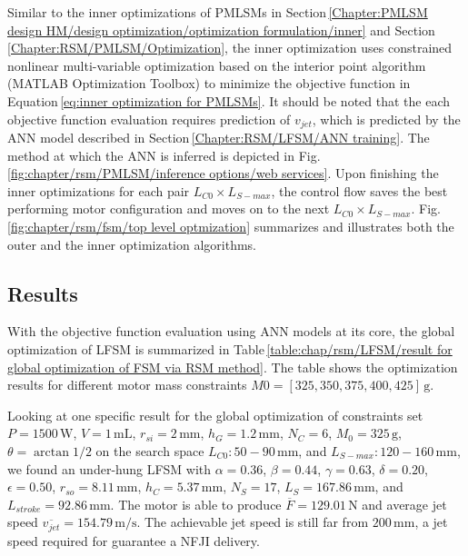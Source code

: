                 
                Similar to the inner optimizations of \acsp{PMLSM} in Section\,\ref{Chapter:PMLSM design HM/design optimization/optimization formulation/inner} and Section\,\ref{Chapter:RSM/PMLSM/Optimization}, the inner optimization uses constrained nonlinear multi-variable optimization based on the interior point algorithm (MATLAB Optimization Toolbox) to minimize the objective function in Equation\,\ref{eq:inner optimization for PMLSMs}. It should be noted that the each objective function evaluation requires prediction of $v_{jet}$, which is predicted by the \acs{ANN} model described in Section\,\ref{Chapter:RSM/LFSM/ANN training}. The method at which the \acs{ANN} is inferred is depicted in Fig.\,\ref{fig:chapter/rsm/PMLSM/inference options/web services}. Upon finishing the inner optimizations for each pair $L_{C0} \times L_{S-max}$, the control flow saves the best performing motor configuration and moves on to the next $L_{C0} \times L_{S-max}$. Fig.\,\ref{fig:chapter/rsm/fsm/top level optmization} summarizes and illustrates both the outer and the inner optimization algorithms.
                
                
                
                
                    

        \subsection{Results}                   \label{Chapter:RSM/LFSM/Results}        
                
            With the objective function evaluation using \acs{ANN} models at its core, the global optimization of \acs{LFSM} is summarized in Table\,\ref{table:chap/rsm/LFSM/result for global optimization of FSM via RSM method}. The table shows the optimization results for different motor mass constraints $M0 = [325, 350, 375, 400, 425]\,\mathrm{g}$.
            
            
            Looking at one specific result for the global optimization of constraints set $P=1500\,\mathrm{W}$, $V=1\,\mathrm{mL}$, $r_{si}=2\,\mathrm{mm}$, $h_G=1.2\,\mathrm{mm}$, $N_C=6$, $M_0=325\,\mathrm{g}$, $\theta = \arctan{1/2}$ on the search space $L_{C0}:50-90\,\mathrm{mm}$, and $L_{S-max}:120-160\,\mathrm{mm}$, we found an under-hung \acs{LFSM} with $\alpha=0.36$, $\beta=0.44$, $\gamma=0.63$, $\delta=0.20$, $\epsilon=0.50$, $r_{so}=8.11\,\mathrm{mm}$, $h_C=5.37\,\mathrm{mm}$, $N_S=17$, $L_S=167.86\,\mathrm{mm}$, and $L_{stroke}=92.86\,\mathrm{mm}$. The motor is able to produce $\overline{F} = 129.01\,\mathrm{N}$ and average jet speed $\overline{v_{jet}}=154.79\,\mathrm{m/s}$. The achievable jet speed is still far from $200\,\mathrm{mm}$, a jet speed required for guarantee a \acs{NFJI} delivery. 
            
